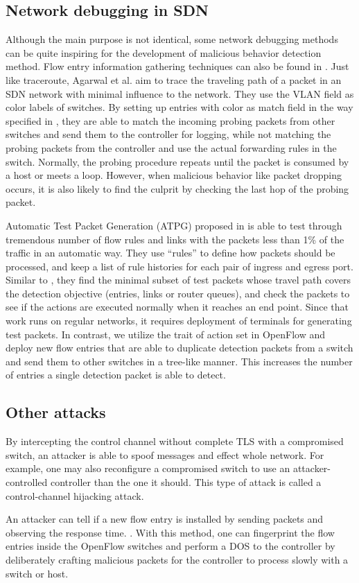 \subsection{Network debugging in SDN}
Although the main purpose is not identical, some network debugging methods can be quite inspiring for the development of malicious behavior detection method. Flow entry information gathering techniques can also be found in \cite{ARDC14}. Just like traceroute, Agarwal et al. aim to trace the traveling path of a packet in an SDN network with minimal influence to the network. They use the VLAN field as color labels of switches. By setting up entries with color as match field in the way specified in \cite{ARDC14}, they are able to match the incoming probing packets from other switches and send them to the controller for logging, while not matching the probing packets from the controller and use the actual forwarding rules in the switch. Normally, the probing procedure repeats until the packet is consumed by a host or meets a loop. However, when malicious behavior like packet dropping occurs, it is also likely to find the culprit by checking the last hop of the probing packet.

Automatic Test Packet Generation (ATPG) proposed in \cite{ZKVM12} is able to test through tremendous number of flow rules and links with the packets less than 1\% of the traffic in an automatic way. They use ``rules'' to define how packets should be processed, and keep a list of rule histories for each pair of ingress and egress port. Similar to \cite{PJL16}, they find the minimal subset of test packets whose travel path covers the detection objective (entries, links or router queues), and check the packets to see if the actions are executed normally when it reaches an end point. Since that work runs on regular networks, it requires deployment of terminals for generating test packets. In contrast, we utilize the trait of action set in OpenFlow and deploy new flow entries that are able to duplicate detection packets from a switch and send them to other switches in a tree-like manner. This increases the number of entries a single detection packet is able to detect. 

\subsection{Other attacks}
By intercepting the control channel without complete TLS with a compromised switch, an attacker is able to spoof messages and effect whole network. For example, one may also reconfigure a compromised switch to use an attacker-controlled controller than the one it should. This type of attack is called a control-channel hijacking attack.

An attacker can tell if a new flow entry is installed by sending packets and observing the response time. \cite{BCKK15}. With this method, one can fingerprint the flow entries inside the OpenFlow switches and perform a DOS to the controller by deliberately crafting malicious packets for the controller to process slowly with a switch or host\cite{AAS14}.